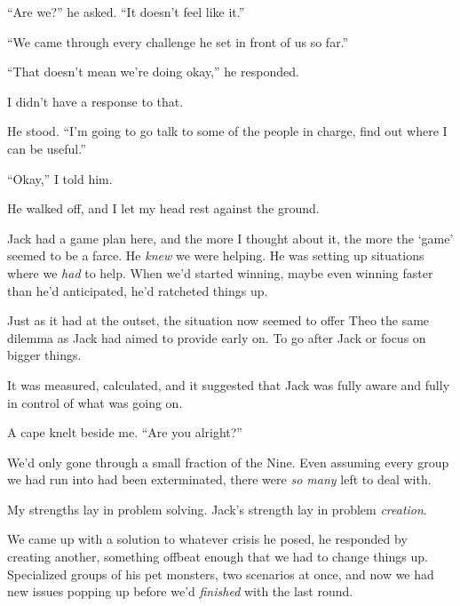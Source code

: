 ``Are we?'' he asked.  ``It doesn't feel like it.''



``We came through every challenge he set in front of us so far.''



``That doesn't mean we're doing okay,'' he responded.



I didn't have a response to that.



He stood.  ``I'm going to go talk to some of the people in charge, find out where I can be useful.''



``Okay,'' I told him.



He walked off, and I let my head rest against the ground.



Jack had a game plan here, and the more I thought about it, the more the `game' seemed to be a farce.  He \emph{knew} we were helping.  He was setting up situations where we \emph{had} to help.  When we'd started winning, maybe even winning faster than he'd anticipated, he'd ratcheted things up.



Just as it had at the outset, the situation now seemed to offer Theo the same dilemma as Jack had aimed to provide early on.  To go after Jack or focus on bigger things.



It was measured, calculated, and it suggested that Jack was fully aware and fully in control of what was going on.



A cape knelt beside me.  ``Are you alright?''



We'd only gone through a small fraction of the Nine.  Even assuming every group we had run into had been exterminated, there were \emph{so many} left to deal with.



My strengths lay in problem solving.  Jack's strength lay in problem \emph{creation}.



We came up with a solution to whatever crisis he posed, he responded by creating another, something offbeat enough that we had to change things up.  Specialized groups of his pet monsters, two scenarios at once, and now we had new issues popping up before we'd \emph{finished }with the last round.



